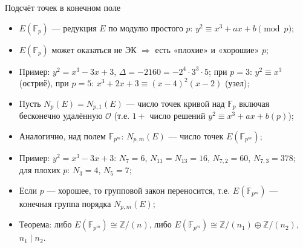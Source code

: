 \documentclass[serif, aspectratio=169]{beamer}
\newcommand{\sagemark}{%
  \textcolor{green!40!black}{\textbf{\texttt{sage:...}}}%
}
\begin{document}
\begin{frame}{Подсчёт точек в конечном поле}
    \begin{itemize}
        \item $E(\mathbb{F}_p)$ --- редукция $E$ по модулю простого $p$: $y^2 \equiv x^3+ax+b \pmod p$;
        \item $E(\mathbb{F}_p)$ может оказаться не ЭК $\Rightarrow$ есть «плохие» и «хорошие» $p$;
        \item Пример: $y^2=x^3-3x+3$, $\Delta=-2160=-2^4\cdot3^3\cdot5$; при $p=3$: $y^2\equiv x^3$ (остриё), при $p=5$: $x^3+2x+3\equiv(x-4)^2(x-2)$ (узел);
        \item Пусть $N_p(E)=N_{p,1}(E)$ --- число точек кривой над $\mathbb{F}_p$ включая бесконечно удалённую $\mathcal{O}$ (т.е. $1+$ число решений $y^2 \equiv x^3+ax+b (p)$);
        \item Аналогично, над полем $\mathbb{F}_{p^m}$: $N_{p,m}(E)$ --- число точек $E(\mathbb{F}_{p^m})$;
        \item Пример: $y^2=x^3-3x+3$: $N_7=6$, $N_{11}=N_{13}=16$, $N_{7,2}=60$, $N_{7,3}=378$;\\ для плохих $p$: $N_3=4$, $N_5=7$;
        \item Если $p$ --- хорошее, то групповой закон переносится, т.е. $E(\mathbb{F}_{p^m})$ --- конечная группа порядка $N_{p,m}(E)$;
        \item Теорема: либо $E(\mathbb{F}_{p^m})\cong\mathbb{Z}/(n)$, либо 
        $E(\mathbb{F}_{p^m})\cong\mathbb{Z}/(n_1)\oplus\mathbb{Z}/(n_2)$, $n_1\mid n_2$.
        
    \end{itemize}


\end{frame}
\end{document}
